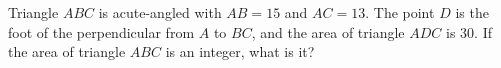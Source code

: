 Triangle $ABC$ is acute-angled with $AB=15$ and $AC=13$. The point $D$ is the foot of the perpendicular from $A$ to $BC$, and the area of triangle $ADC$ is $30$. If the area of triangle $ABC$ is an integer, what is it?
